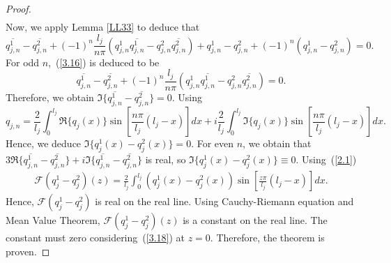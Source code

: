 \documentclass[10pt,a4paper]{article}
\theoremstyle{plain}
\theoremstyle{definition}
\theoremstyle{remark}
\numberwithin{equation}{section}
\begin{document}
\begin{proof}
\begin{eqnarray}
\end{eqnarray}
Now, we apply Lemma \ref{LL33} to deduce that
\begin{equation}
\overline{q^{1}_{j,n}}-\overline{{q}^{2}_{j,n}}+(-1)^{n}\frac{l_{j}}{n\pi}(q^{1}_{j,n}\overline{q^{1}_{j,n}}-q^{2}_{j,n}\overline{q^{2}_{j,n}})
+q^{1}_{j,n}-q^{2}_{j,n}+(-1)^{n}(q^{1}_{j,n}-q^{2}_{j,n})=0.\label{3.16}
\end{equation}
For odd $n$,~(\ref{3.16}) is deduced to be 
\begin{equation}
\overline{q^{1}_{j,n}}-\overline{{q}^{2}_{j,n}}+(-1)^{n}\frac{l_{j}}{n\pi}(q^{1}_{j,n}\overline{q^{1}_{j,n}}-q^{2}_{j,n}\overline{q^{2}_{j,n}})=0.
\end{equation}
Therefore, we obtain $\Im \{\overline{q^{1}_{j,n}}-\overline{{q}^{2}_{j,n}}\}=0$.
Using $$q_{j,n}=\frac{2}{l_{j}}\int_{0}^{l_{j}}\Re\{q_{j}(x)\}\sin[\frac{n\pi}{l_{j}} (l_{j}-x)]dx+i\frac{2}{l_{j}}\int_{0}^{l_{j}}\Im\{q_{j}(x)\}\sin[\frac{n\pi}{l_{j}} (l_{j}-x)]dx.$$
Hence, we deduce $\Im\{q_{j}^{1}(x)-q_{j}^{2}(x)\}=0$. For even $n$, we obtain that $3\Re\{\overline{q^{1}_{j,n}}-\overline{{q}^{2}_{j,n}}\}+i\Im\{\overline{q^{1}_{j,n}}-\overline{{q}^{2}_{j,n}}\}$ is real, so  $\Im\{q_{j}^{1}(x)-q_{j}^{2}(x)\}\equiv0$. 
Using~(\ref{2.1})
\begin{eqnarray}\label{3.18}
\mathcal{F}(q^{1}_{j}-q^{2}_{j})(z)=\frac{2}{l_{j}}\int_{0}^{l_{j}}(q^{1}_{j}(x)-q^{2}_{j}(x))\sin[\frac{z\pi}{l_{j}} (l_{j}-x)]dx.
\end{eqnarray}
Hence, $\mathcal{F}(q^{1}_{j}-q^{2}_{j})$ is real on the real line. Using Cauchy-Riemann equation and Mean Value Theorem, $\mathcal{F}(q^{1}_{j}-q^{2}_{j})(z)$ is a constant on the real line. The constant must zero considering~(\ref{3.18}) at $z=0$. Therefore, the theorem is proven.





\end{proof}
\end{document}
